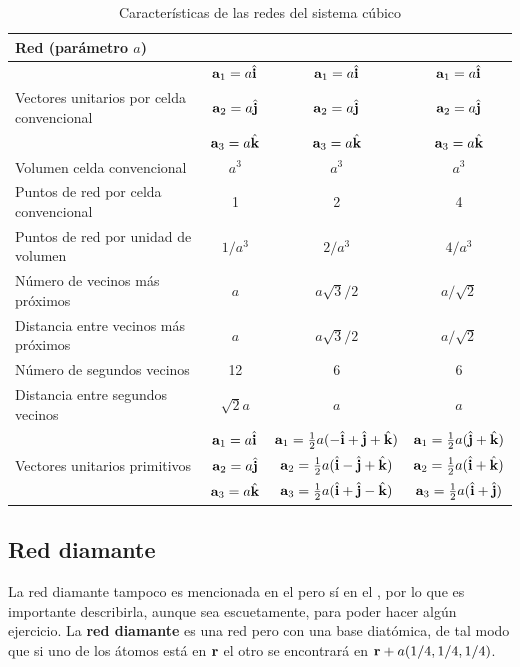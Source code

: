 \begin{table}[h!] \centering
	\begin{tabular}{lccc}
		Red (parámetro $a$) & \sc & \bcc & \fcc \\ \hline 
		& $\mathbf{a}_1=a\hat{\mathbf{i}}$ &  $\mathbf{a}_1=a\hat{\mathbf{i}}$ & $\mathbf{a}_1=a\hat{\mathbf{i}}$  \\		
		Vectores unitarios por celda convencional  & $\mathbf{a}_2=a\hat{\mathbf{j}}$  & $\mathbf{a}_2=a\hat{\mathbf{j}}$  &  $\mathbf{a}_2=a\hat{\mathbf{j}}$ \\
		& $\mathbf{a}_3=a\hat{\mathbf{k}}$ & $\mathbf{a}_3=a\hat{\mathbf{k}}$  & $\mathbf{a}_3=a\hat{\mathbf{k}}$ \\ \hline
		Volumen celda convencional & $a^3$ & $a^3$ & $a^3$ \\ \hline
		Puntos de red por celda convencional & 1 & 2 & 4 \\ \hline
		Puntos de red por unidad de volumen & $1/a^3$ &  $2/a^3$ &  $4/a^3$ \\ \hline
		Número de vecinos más próximos & $a$ & $a\sqrt{3}/2$ & $a/\sqrt{2}$ \\ \hline
		Distancia entre vecinos más próximos & $a$ & $a\sqrt{3}/2$ & $a/\sqrt{2}$ \\ \hline
		Número de segundos vecinos & 12 & 6 & 6 \\ \hline
		Distancia entre segundos vecinos & $\sqrt{2} a$ & $a$ & $a$ \\ \hline
		& $\mathbf{a}_1=a\hat{\mathbf{i}}$ &  $\mathbf{a}_1=\frac{1}{2} a (-\hat{\mathbf{i}}+\hat{\mathbf{j}}+\hat{\mathbf{k}})$ &   $\mathbf{a}_1=\frac{1}{2} a (\hat{\mathbf{j}}+\hat{\mathbf{k}})$  \\
		Vectores unitarios primitivos &$\mathbf{a}_2=a\hat{\mathbf{j}}$ &  $\mathbf{a}_2=\frac{1}{2} a (\hat{\mathbf{i}}-\hat{\mathbf{j}}+\hat{\mathbf{k}})$ &   $\mathbf{a}_2=\frac{1}{2} a (\hat{\mathbf{i}}+\hat{\mathbf{k}})$  \\
		&$\mathbf{a}_3=a\hat{\mathbf{k}}$ &  $\mathbf{a}_3=\frac{1}{2} a (\hat{\mathbf{i}}+\hat{\mathbf{j}}-\hat{\mathbf{k}})$ &   $\mathbf{a}_3=\frac{1}{2} a (\hat{\mathbf{i}}+\hat{\mathbf{j}})$  \\ \hline		
	\end{tabular}
	\caption{Características de las redes del sistema cúbico}
	\label{Tab:01-03}
\end{table} 

\subsection{Red diamante}

La red diamante tampoco es mencionada en el \cite{Fisica_del_Estado_Solido} pero sí en el \cite{Fisica_del_Estado_Solido_Resueltos}, por lo que es importante describirla, aunque sea escuetamente, para poder hacer algún ejercicio. La \textbf{red diamante} es una red \fcc pero con una base diatómica, de tal modo que si uno de los átomos está en $\mathbf{r}$ el otro se encontrará en $\mathbf{r}+a(1/4,1/4,1/4)$. 

